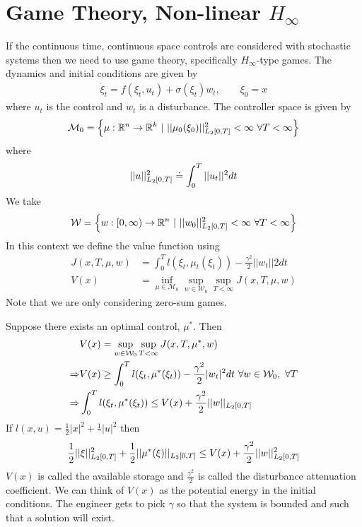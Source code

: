 \section{Game Theory, Non-linear $H_\infty$}
If the continuous time, continuous space controls are considered with stochastic systems then we need to use game theory, specifically $H_\infty$-type games.
The dynamics and initial conditions are given by
\begin{align*}
\dot{\xi}_t = f(\xi_t,u_t) + \sigma(\xi_t)w_t, \qquad \xi_0=x
\end{align*}
where $u_t$ is the control and $w_t$ is a disturbance. The controller space is given by
$$\mathcal{M}_0 = \left\lbrace \mu:\mathbb{R}^n\to\mathbb{R}^k ~|~ ||\mu_0(\xi_0)||^2_{L_2[0,T]}<\infty ~\forall T<\infty\right\rbrace$$
where
$$||u||^2_{L_2[0,T]}\doteq\int_0^T||u_t||^2dt$$
We take
$$\mathcal{W}=\left\lbrace w:[0,\infty)\to\mathbb{R}^n ~|~ ||w_0||^2_{L_2[0,T]}<\infty ~\forall T<\infty \right\rbrace$$
In this context we define the value function using
\begin{align*}
J(x,T,\mu,w) &= \int_0^Tl(\xi_t,\mu_t(\xi_t)) - \frac{\gamma^2}{2}||w_t||2dt \\
V(x) &= \inf_{\mu\in\mathcal{M}_0}\sup_{w\in\mathcal{W}_0}\sup_{T<\infty} J(x,T,\mu,w)
\end{align*}
Note that we are only considering zero-sum games.

Suppose there exists an optimal control, $\mu^\ast$. Then
\begin{align*}
&V(x) = \sup_{w\in\mathcal{W}_0}\sup_{T<\infty}J(x,T,\mu^\ast,w) \\
\Rightarrow &V(x) \geq \int_0^Tl(\xi_t,\mu^\ast(\xi_t)) - \frac{\gamma^2}{2}|w_t|^2dt ~\forall w\in\mathcal{W}_0, ~\forall T \\
\Rightarrow &\int_0^Tl(\xi_t,\mu^\ast(\xi_t)) \leq V(x) + \frac{\gamma^2}{2}||w||_{L_2[0,T]}
\end{align*}
If $l(x,u)  = \frac{1}{2}|x|^2+\frac{1}{}|u|^2$ then
$$\frac{1}{2}||\xi||^2_{L_2[0,T]} + \frac{1}{2}||\mu^\ast(\xi)||_{L_2[0,T]} \leq V(x) + \frac{\gamma^2}{2}||w||^2_{L_2[0,T]}$$
$V(x)$ is called the available storage and $\frac{\gamma^2}{2}$ is called the disturbance attenuation coefficient. We can think of $V(x)$ as the potential energy in the initial conditions. The engineer gets to pick $\gamma$ so that the system is bounded and such that a solution will exist.

